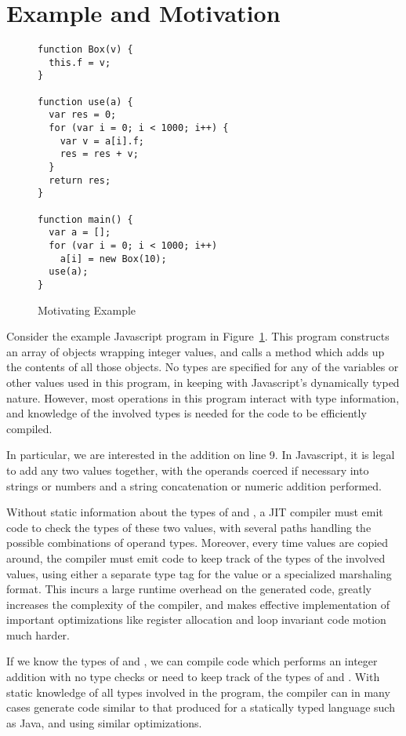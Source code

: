 
\section{Example and Motivation}
\label{sec:example}

\begin{figure}
\begin{lstlisting}[xleftmargin=18pt]
function Box(v) {
  this.f = v;
}

function use(a) {
  var res = 0;
  for (var i = 0; i < 1000; i++) {
    var v = a[i].f;
    res = res + v;
  }
  return res;
}

function main() {
  var a = [];
  for (var i = 0; i < 1000; i++)
    a[i] = new Box(10);
  use(a);
}
\end{lstlisting}
\caption{Motivating Example}
\label{fig:motivating-example}
\end{figure}

Consider the example Javascript program in Figure~\ref{fig:motivating-example}.
This program constructs an array of  objects wrapping integer
values, and calls a  method which adds up the contents of all
those  objects.
No types are specified for any of the variables or other values used
in this program, in keeping with Javascript's dynamically typed nature.
However, most operations in this program interact with type information,
and knowledge of the involved types is needed for the code to
be efficiently compiled.

In particular, we are interested in the addition
 on line 9.
In Javascript, it is legal to add any two values together, with the
operands coerced if necessary into strings or numbers and a string
concatenation or numeric addition performed.

Without static information about the types of  and ,
a JIT compiler must emit code to check the types of these two values,
with several paths handling the possible combinations of
operand types.
Moreover, every time values are copied around, the compiler must emit
code to keep track of the types of the involved values, using either
a separate type tag for the value or a specialized marshaling format.
This incurs a large runtime overhead on the generated code,
greatly increases the complexity of the compiler,
and makes effective implementation of important optimizations like
register allocation and loop invariant code motion much harder.

If we know the types of  and , we can compile
code which performs an integer addition with no type checks or need
to keep track of the types of  and .
With static knowledge of all types involved in the program, the compiler can
in many cases generate code similar to that produced for a statically
typed language such as Java, and using similar optimizations.

